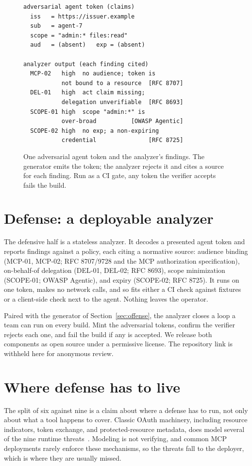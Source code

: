 \begin{figure}[t]
\footnotesize
\begin{verbatim}
adversarial agent token (claims)
  iss   = https://issuer.example
  sub   = agent-7
  scope = "admin:* files:read"
  aud   = (absent)   exp = (absent)

analyzer output (each finding cited)
  MCP-02   high  no audience; token is
           not bound to a resource  [RFC 8707]
  DEL-01   high  act claim missing;
           delegation unverifiable  [RFC 8693]
  SCOPE-01 high  scope "admin:*" is
           over-broad          [OWASP Agentic]
  SCOPE-02 high  no exp; a non-expiring
           credential               [RFC 8725]
\end{verbatim}
\caption{One adversarial agent token and the analyzer's findings. The generator emits
the token; the analyzer rejects it and cites a source for each finding. Run as a CI
gate, any token the verifier accepts fails the build.}
\label{fig:loop}
\end{figure}

\section{Defense: a deployable analyzer}\label{sec:defense}
The defensive half is a stateless analyzer. It decodes a presented agent token and
reports findings against a policy, each citing a normative source: audience binding
(MCP-01, MCP-02; RFC 8707/9728 and the MCP authorization specification), on-behalf-of
delegation (DEL-01, DEL-02; RFC 8693), scope minimization (SCOPE-01; OWASP Agentic),
and expiry (SCOPE-02; RFC 8725). It runs on one token, makes no network calls, and so
fits either a CI check against fixtures or a client-side check next to the agent.
Nothing leaves the operator.

Paired with the generator of Section~\ref{sec:offense}, the analyzer closes a loop a
team can run on every build. Mint the adversarial tokens, confirm the verifier rejects
each one, and fail the build if any is accepted. We release both components as open
source under a permissive license. The repository link is withheld here for anonymous
review.

\section{Where defense has to live}\label{sec:line}
The split of six against nine is a claim about where a defense has to run, not only
about what a tool happens to cover. Classic OAuth machinery, including resource
indicators, token exchange, and protected-resource metadata, does model several of
the nine runtime threats~\cite{rfc8707,rfc8693,rfc9728}. Modeling is not verifying,
and common MCP deployments rarely enforce these mechanisms, so the threats fall to the
deployer, which is where they are usually missed.


